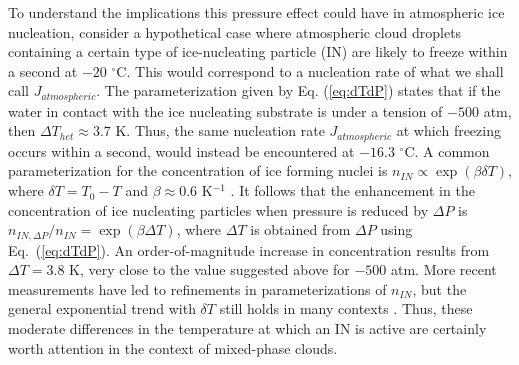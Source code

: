 \documentclass[journal abbreviation, manuscript]{copernicus}
\begin{document}
To understand the implications this pressure effect could have in atmospheric ice nucleation, consider a hypothetical case where atmospheric cloud droplets containing a certain type of ice-nucleating particle (IN) are likely to freeze within a second at $-20$ $^\circ$C. This would correspond to a nucleation rate of what we shall call $J_{atmospheric}$. The parameterization given by Eq. (\ref{eq:dTdP}) states that if the water in contact with the ice nucleating substrate is under a tension of $-500$ atm, then $\Delta T_{het} \approx 3.7$ K. Thus, the same nucleation rate $J_{atmospheric}$ at which freezing occurs within a second, would instead be encountered at $-16.3$ $^\circ$C. A common parameterization for the concentration of ice forming nuclei is $n_{IN} \propto \exp (\beta \delta T)$, where $\delta T = T_0 -T$ and $\beta \approx 0.6$ K$^{-1}$ \citep[Sec. 9.2]{pruppacher1997}. It follows that the enhancement in the concentration of ice nucleating particles when pressure is reduced by $\Delta P$ is $n_{IN,\Delta P} / n_{IN} = \exp (\beta \Delta T)$, where $\Delta T$ is obtained from $\Delta P$ using Eq.~(\ref{eq:dTdP}). An order-of-magnitude increase in concentration results from $\Delta T = 3.8$ K, very close to the value suggested above for $-500$ atm. More recent measurements have led to refinements in parameterizations of $n_{IN}$, but the general exponential trend with $\delta T$ still holds in many contexts \citep{demott2010predicting}. Thus, these moderate differences in the temperature at which an IN is active are certainly worth attention in the context of mixed-phase clouds.
\end{document}
